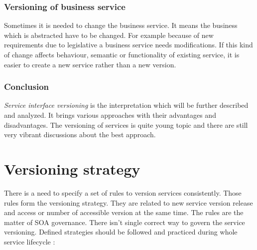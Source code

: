 \subsubsection{Versioning of business service}
Sometimes it is needed to change the business service. It means the business which is abstracted have to be changed. For example because of new requirements due to legislative a business service needs modifications. If this kind of change affects behaviour, semantic or functionality of existing service, it is easier to create a new service rather than a new version. 

\subsubsection{Conclusion}
\emph{Service interface versioning} is the interpretation which will be further described and analyzed. It brings various approaches with their advantages and disadvantages. The versioning of services is quite young topic and there are still very vibrant discussions about the best approach.

\section{Versioning strategy}
\label{sec:version-strategy}
There is a need to specify a set of rules to version services consistently. Those rules form the versioning strategy. They are related to new service version release and access or number of accessible version at the same time. The rules are the matter of SOA governance. There isn't single correct way to govern the service versioning. Defined strategies should be followed and practiced during whole service lifecycle \cite{soa-governance}:

